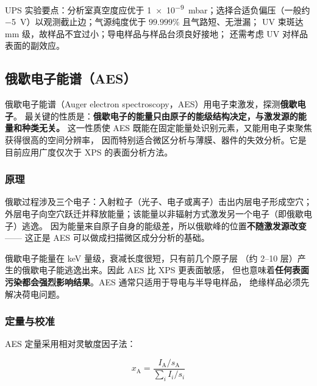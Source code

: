 \begin{measure}
UPS 实验要点：分析室真空度应优于 \qty{1e-9}{mbar}；选择合适负偏压（一般约
\qty{-5}{V}）以观测截止边；气源纯度优于 $99.999\%$ 且气路短、无泄漏；
UV 束斑达 \unit{mm} 级，故样品不宜过小；导电样品与样品台须良好接地；
还需考虑 UV 对样品表面的副效应。
\end{measure}

\subsection{俄歇电子能谱（AES）}

\begin{probout}
俄歇电子能谱（Auger electron spectroscopy，AES）用电子束激发，探测\textbf{俄歇电子}。
最关键的性质是：\textbf{俄歇电子的能量只由原子的能级结构决定，与激发源的能量和种类无关。}
这一性质使 AES 既能在固定能量处识别元素，又能用电子束聚焦获得很高的空间分辨率，
因而特别适合微区分析与薄膜、器件的失效分析。它是目前应用广度仅次于 XPS 的表面分析方法。
\end{probout}

\subsubsection{原理}

俄歇过程涉及三个电子：入射粒子（光子、电子或离子）击出内层电子形成空穴；
外层电子向空穴跃迁并释放能量；该能量以非辐射方式激发另一个电子（即俄歇电子）逃逸。
因为能量来自原子自身的能级差，所以俄歇峰的位置\textbf{不随激发源改变}——
这正是 AES 可以做成扫描微区成分分析的基础。

\begin{keycond}
俄歇电子能量在 \unit{keV} 量级，衰减长度很短，只有前几个原子层
（约 2--10 层）产生的俄歇电子能逃逸出来。因此 AES 比 XPS 更表面敏感，
但也意味着\textbf{任何表面污染都会强烈影响结果}。AES 通常只适用于导电与半导电样品，
绝缘样品必须先解决荷电问题。
\end{keycond}

\subsubsection{定量与校准}

AES 定量采用相对灵敏度因子法：

\begin{equation}\label{eq:aes-quant}
x_{\mathrm{A}}=\frac{I_{\mathrm{A}}/s_{\mathrm{A}}}{\sum_{i} I_{i}/s_{i}}
\end{equation}

